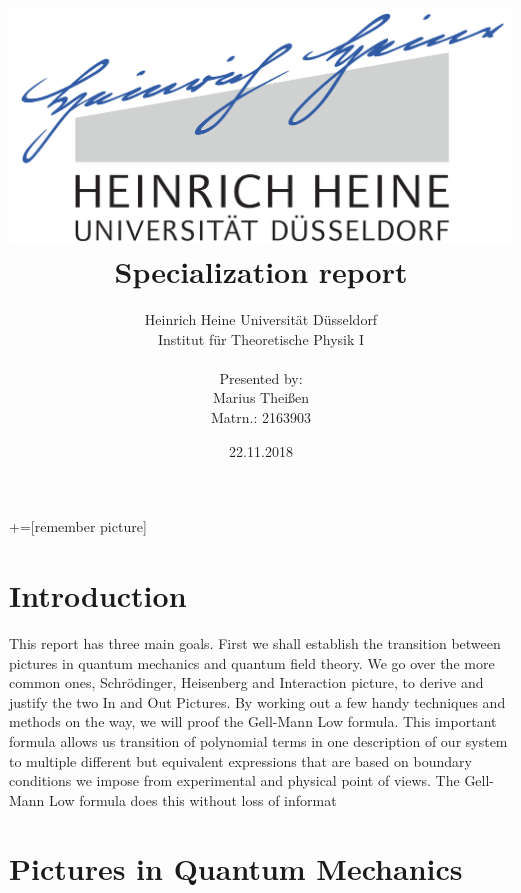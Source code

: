 \documentclass[12pt, titlepage]{article}
\title{\includegraphics[scale=0.07]{logo}\\Specialization report}
\date{22.11.2018}
\author{ Heinrich Heine Universit\"at D\"usseldorf\\ Institut f\"ur Theoretische Physik I\\  \\Presented by:\\Marius Thei\ss{}en\\ Matrn.: 2163903 \\  }
\begin{document}
+=[remember picture]
\everymath{\displaystyle}

\maketitle %
\tableofcontents
\newpage
\section{Introduction}
This report has three main goals. First we shall establish the transition between pictures in quantum mechanics and quantum field theory. We go over the more common ones, Schrödinger, Heisenberg and Interaction picture, to derive and justify the two In and Out Pictures.
By working out a few handy techniques and methods on the way, we will proof the Gell-Mann Low formula. This important formula allows us transition of polynomial terms in one description of our system to multiple different but equivalent expressions that are based on boundary conditions we impose from experimental and physical point of views. The Gell-Mann Low formula does this without loss of informat

\section{Pictures in Quantum Mechanics }
\end{document}
